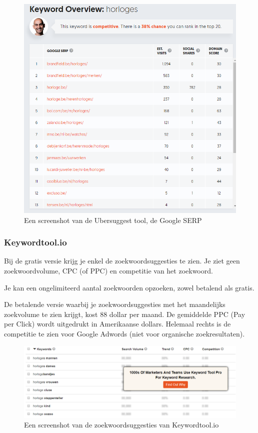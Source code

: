 \begin{figure}[h!]
\centering
\includegraphics[width=\linewidth]{img/ubersrechts.PNG}
\caption{Een screenshot van de Ubersuggest tool, de Google SERP \autocite{ubersuggest}}
\end{figure}

\subsubsection{Keywordtool.io}
\label{ch: Keywordtool.io}

Bij de gratis versie krijg je enkel de zoekwoordsuggesties te zien. Je ziet geen zoekwoordvolume, CPC (of PPC) en competitie van het zoekwoord. 

Je kan een ongelimiteerd aantal zoekwoorden opzoeken, zowel betalend als gratis. 

De betalende versie waarbij je zoekwoordsuggesties met het maandelijks zoekvolume te zien krijgt, kost 88 dollar per maand. De gemiddelde PPC (Pay per Click) wordt uitgedrukt in Amerikaanse dollars. Helemaal rechts is de competitie te zien voor Google Adwords (niet voor organische zoekresultaten). 

\begin{figure}[h!]
\centering
\includegraphics[width=\linewidth]{img/keywordtoolio.PNG}
\caption{Een screenshot van de zoekwoordsuggesties van Keywordtool.io \autocite{keywordtoolio}}
\end{figure}

